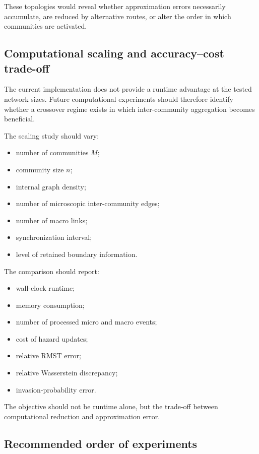 \documentclass[12pt,a4paper]{article}
\begin{document}
These topologies would reveal whether approximation errors necessarily accumulate, are reduced by alternative routes, or alter the order in which communities are activated.

\subsection{Computational scaling and accuracy--cost trade-off}

The current implementation does not provide a runtime advantage at the tested network sizes. Future computational experiments should therefore identify whether a crossover regime exists in which inter-community aggregation becomes beneficial.

The scaling study should vary:
\begin{itemize}
    \item number of communities \(M\);
    \item community size \(n\);
    \item internal graph density;
    \item number of microscopic inter-community edges;
    \item number of macro links;
    \item synchronization interval;
    \item level of retained boundary information.
\end{itemize}

The comparison should report:
\begin{itemize}
    \item wall-clock runtime;
    \item memory consumption;
    \item number of processed micro and macro events;
    \item cost of hazard updates;
    \item relative RMST error;
    \item relative Wasserstein discrepancy;
    \item invasion-probability error.
\end{itemize}

The objective should not be runtime alone, but the trade-off between computational reduction and approximation error.

\subsection{Recommended order of experiments}
\end{document}
